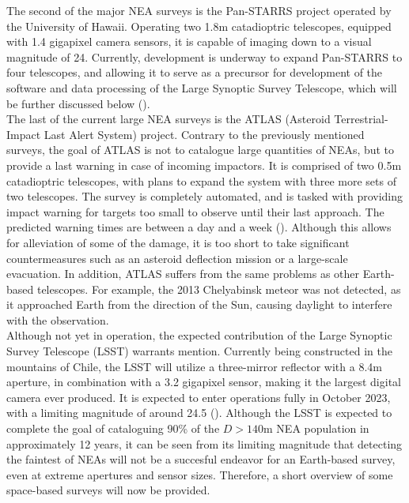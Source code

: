 The second of the major NEA surveys is the Pan-STARRS project operated by the University of Hawaii. Operating two 1.8m catadioptric telescopes, equipped with 1.4 gigapixel camera sensors, it is capable of imaging down to a visual magnitude of 24. Currently, development is underway to expand Pan-STARRS to four telescopes, and allowing it to serve as a precursor for development of the software and data processing of the Large Synoptic Survey Telescope, which will be further discussed below (\cite{PANSTARRS}).\\

The last of the current large NEA surveys is the ATLAS (Asteroid Terrestrial-Impact Last Alert System) project. Contrary to the previously mentioned surveys, the goal of ATLAS is not to catalogue large quantities of NEAs, but to provide a last warning in case of incoming impactors. It is comprised of two 0.5m catadioptric telescopes, with plans to expand the system with three more sets of two telescopes. The survey is completely automated, and is tasked with providing impact warning for targets too small to observe until their last approach. The predicted warning times are between a day and a week (\cite{ATLAS}). Although this allows for alleviation of some of the damage, it is too short to take significant countermeasures such as an asteroid deflection mission or a large-scale evacuation. In addition, ATLAS suffers from the same problems as other Earth-based telescopes. For example, the 2013 Chelyabinsk meteor was not detected, as it approached Earth from the direction of the Sun, causing daylight to interfere with the observation.\\

Although not yet in operation, the expected contribution of the Large Synoptic Survey Telescope (LSST) warrants mention. Currently being constructed in the mountains of Chile, the LSST will utilize a three-mirror reflector with a 8.4m aperture, in combination with a 3.2 gigapixel sensor, making it the largest digital camera ever produced. It is expected to enter operations fully in October 2023, with a limiting magnitude of around 24.5 (\cite{LSST}). Although the LSST is expected to complete the goal of cataloguing 90\% of the $D > 140 \mathrm{m}$ NEA population in approximately 12 years, it can be seen from its limiting magnitude that detecting the faintest of NEAs will not be a succesful endeavor for an Earth-based survey, even at extreme apertures and sensor sizes. Therefore, a short overview of some space-based surveys will now be provided.\\

